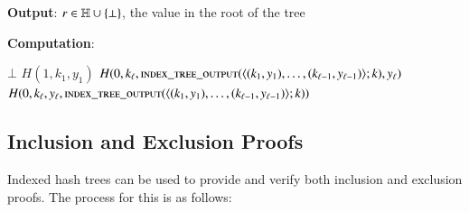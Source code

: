 \textbf{Output}:
$r \in \mathbb{H}\cup\{\bot\}$, the value in the root of the tree

\textbf{Computation}:
\begin{algorithmic}
	 
		\State \Return $\bot$
	 
		\State \Return $H(1, k_1, y_1)$
	\Else
			\State \Return $H(0, k_\ell, \Call{index\_tree\_output}{\langle (k_1, y_1), \ldots, (k_{\ell-1}, y_{\ell-1}) \rangle; k}, y_\ell)$
		\Else
			\State \Return $H(0, k_\ell, y_\ell, \Call{index\_tree\_output}{\langle (k_1, y_1), \ldots, (k_{\ell-1}, y_{\ell-1}) \rangle; k})$
		\EndIf
	\EndIf
	\EndFunction
\end{algorithmic}

\subsection{Inclusion and Exclusion Proofs}

Indexed hash trees can be used to provide and verify both inclusion and exclusion proofs. The process for this is as follows:

